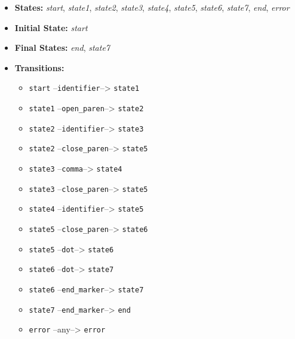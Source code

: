 \documentclass{article}
\begin{document}
\begin{itemize}
    \item \textbf{States:} \textit{start}, \textit{state1}, \textit{state2}, \textit{state3}, \textit{state4}, \textit{state5}, \textit{state6}, \textit{state7}, \textit{end}, \textit{error}
    \item \textbf{Initial State:} \textit{start}
    \item \textbf{Final States:} \textit{end}, \textit{state7}
    \item \textbf{Transitions:}
    \begin{itemize}
        \item \texttt{start} --\texttt{identifier}--> \texttt{state1}
        \item \texttt{state1} --\texttt{open\_paren}--> \texttt{state2}
        \item \texttt{state2} --\texttt{identifier}--> \texttt{state3}
        \item \texttt{state2} --\texttt{close\_paren}--> \texttt{state5} %
        \item \texttt{state3} --\texttt{comma}--> \texttt{state4}
        \item \texttt{state3} --\texttt{close\_paren}--> \texttt{state5} %
        \item \texttt{state4} --\texttt{identifier}--> \texttt{state5}
        \item \texttt{state5} --\texttt{close\_paren}--> \texttt{state6}
        \item \texttt{state5} --\texttt{dot}--> \texttt{state6} %
        \item \texttt{state6} --\texttt{dot}--> \texttt{state7}
        \item \texttt{state6} --\texttt{end\_marker}--> \texttt{state7} %
        \item \texttt{state7} --\texttt{end\_marker}--> \texttt{end}
        \item \texttt{error} --any--> \texttt{error}
    \end{itemize}
\end{itemize}
\end{document}

